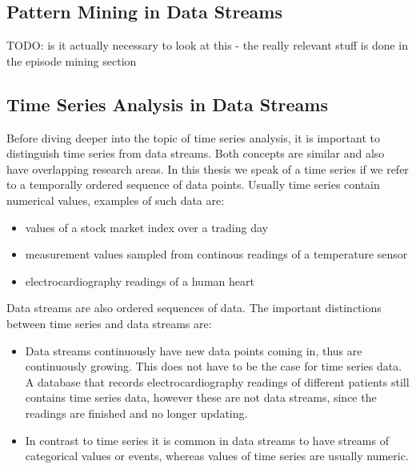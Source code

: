 \subsection{Pattern Mining in Data Streams}
\label{subsec_PatternMining}

TODO: is it actually necessary to look at this - the really relevant stuff is done in the episode mining section

\subsection{Time Series Analysis in Data Streams}
\label{subsec_timeSeriesAnalysis}
Before diving deeper into the topic of time series analysis, it is important to distinguish time series from data streams. Both concepts are similar and also have overlapping research areas. In this thesis we speak of a time series if we refer to a temporally ordered sequence of data points. Usually time series contain numerical values, examples of such data are:

\begin{itemize}
	\item values of a stock market index over a trading day
	\item measurement values sampled from continous readings of a temperature sensor
	\item electrocardiography readings of a human heart
\end{itemize}

Data streams are also ordered sequences of data. The important distinctions between time series and data streams are: 

\begin{itemize}
	\item Data streams continuously have new data points coming in, thus are continuously growing. This does not have to be the case for time series data. A database that records electrocardiography readings of different patients still contains time series data, however these are not data streams, since the readings are finished and no longer updating.
	\item In contrast to time series it is common in data streams to have streams of categorical values or events, whereas values of time series are usually numeric.
\end{itemize}

